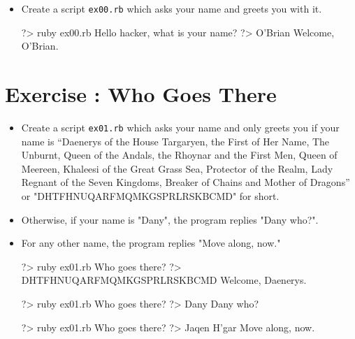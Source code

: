 \documentclass{42-en}
\begin{document}
\begin{itemize}

\item Create a script \texttt{ex00.rb} which asks your name and greets you with it.

\begin{42console}
	?> ruby ex00.rb
	Hello hacker, what is your name?
	?> O'Brian
	Welcome, O'Brian.
\end{42console}

\end{itemize}



\chapter{Exercise \exercicenumber: Who Goes There}

\exnumber{\exercicenumber}


\begin{itemize}

\item Create a script \texttt{ex01.rb} which asks your name and only greets you if your name is “Daenerys of the House Targaryen, the First of Her Name, The Unburnt, Queen of the Andals, the Rhoynar and the First Men, Queen of Meereen, Khaleesi of the Great Grass Sea, Protector of the Realm, Lady Regnant of the Seven Kingdoms, Breaker of Chains and Mother of Dragons” or "DHTFHNUQARFMQMKGSPRLRSKBCMD" for short. 
\item Otherwise, if your name is "Dany", the program replies "Dany who?". 
\item For any other name, the program replies "Move along, now."

\begin{42console}
	?> ruby ex01.rb
	Who goes there?
	?> DHTFHNUQARFMQMKGSPRLRSKBCMD
	Welcome, Daenerys.
\end{42console}

\begin{42console}
	?> ruby ex01.rb
	Who goes there?
	?> Dany
	Dany who?
\end{42console}

\begin{42console}
	?> ruby ex01.rb
	Who goes there?
	?> Jaqen H'gar
	Move along, now.
\end{42console}

\end{itemize}
\end{document}
